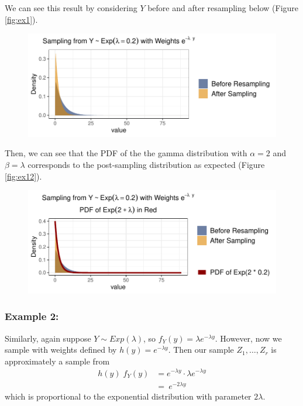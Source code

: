 \documentclass[12pt,twoside]{smiththesis}
\begin{document}
We can see this result by considering \(Y\) before and after resampling below (Figure \ref{fig:ex1}).
\begin{figure}

{\centering \includegraphics[width=1\linewidth]{thesis_files/figure-latex/unnamed-chunk-15-1} 

}

\caption{\label{fig:ex1}}\label{fig:unnamed-chunk-15}
\end{figure}
Then, we can see that the PDF of the the gamma distribution with \(\alpha = 2\) and \(\beta = \lambda\) corresponds to the post-sampling distribution as expected (Figure \ref{fig:ex12}).
\begin{figure}

{\centering \includegraphics[width=1\linewidth]{thesis_files/figure-latex/unnamed-chunk-16-1} 

}

\caption{\label{fig:ex12}}\label{fig:unnamed-chunk-16}
\end{figure}
\newpage

\hypertarget{example-2}{%
\subsubsection{Example 2:}\label{example-2}}

Similarly, again suppose \(Y \sim Exp(\lambda)\), so \(f_Y(y) = \lambda e^{-\lambda y}\). However, now we sample with weights defined by \(h(y)= e^{-\lambda y}\).
Then our sample \(Z_1,\dots,Z_r\) is approximately a sample from
\begin{align*} 
h(y) \; f_Y(y) &=   e^{-\lambda y} \cdot \lambda e^{-\lambda y}\\
&= \ e^{-2 \lambda y}  
\end{align*}
which is proportional to the exponential distribution with parameter \(2\lambda\).
\end{document}

